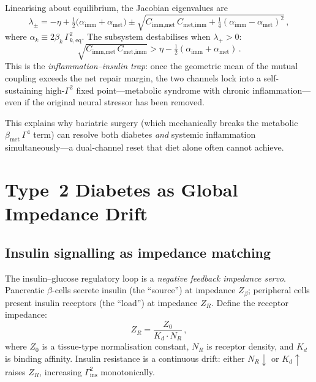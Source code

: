 \documentclass[aps,pre,twocolumn,superscriptaddress,floatfix]{revtex4-2}
\begin{document}
Linearising about equilibrium, the Jacobian
eigenvalues are
\begin{equation}
  \lambda_\pm
  = -\eta + \tfrac{1}{2}
    \bigl(\alpha_{\text{imm}}
    + \alpha_{\text{met}}\bigr)
  \pm \sqrt{C_{\text{imm,met}}\,
    C_{\text{met,imm}}
    + \tfrac{1}{4}(\alpha_{\text{imm}}
    - \alpha_{\text{met}})^2}\,,
  \label{eq:imm-met-eigenvalue}
\end{equation}
where
$\alpha_k \equiv 2\beta_k\,\Gamma_{k,\text{eq}}^2$.
The subsystem destabilises when $\lambda_+ > 0$:
\begin{equation}
  \sqrt{C_{\text{imm,met}}\,C_{\text{met,imm}}}
  > \eta - \tfrac{1}{2}
    (\alpha_{\text{imm}} + \alpha_{\text{met}})\,.
  \label{eq:imm-met-threshold}
\end{equation}
This is the \emph{inflammation--insulin trap}:
once the geometric mean of the mutual coupling
exceeds the net repair margin, the two channels
lock into a self-sustaining high-$\Gamma^2$
fixed point---metabolic syndrome with chronic
inflammation---even if the original neural
stressor has been removed.

This explains why bariatric surgery
(which mechanically breaks the metabolic
$\beta_{\text{met}}\,\Gamma^4$ term)
can resolve both diabetes \emph{and} systemic
inflammation simultaneously---a dual-channel
reset that diet alone often cannot achieve.


\section{Type~2 Diabetes as Global Impedance Drift}
\label{sec:t2d-derivation}


\subsection{Insulin signalling as impedance matching}
\label{sec:insulin-impedance}

The insulin--glucose regulatory loop is a
\emph{negative feedback impedance servo}.
Pancreatic $\beta$-cells secrete insulin
(the ``source'') at impedance $Z_\beta$;
peripheral cells present insulin receptors
(the ``load'') at impedance $Z_R$.
Define the receptor impedance:
\begin{equation}
  Z_R = \frac{Z_0}{K_d \cdot N_R}\,,
  \label{eq:z-receptor}
\end{equation}
where $Z_0$ is a tissue-type normalisation constant,
$N_R$ is receptor density, and $K_d$ is binding
affinity.
Insulin resistance is a continuous drift:
either $N_R \downarrow$ or $K_d \uparrow$
raises $Z_R$, increasing $\Gamma_{\text{ins}}^2$
monotonically.
\end{document}
